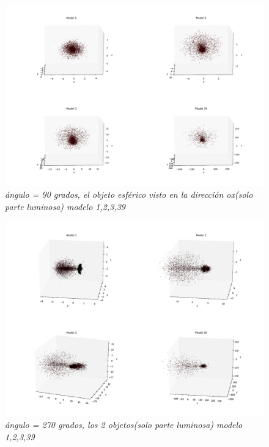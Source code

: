 \documentclass[12pt]{article} %
\renewcommand{\=}[1]{\stackrel{#1}{=}} %
\theoremstyle{definition}
\theoremstyle{remark}
\begin{document}
\begin{figure}[!ht]
 \centering
 \includegraphics[scale=0.2]{sep590deg-2ox.png}
 \caption{\emph{ ángulo = 90 grados, el objeto esférico visto en la dirección ox(solo parte luminosa) modelo 1,2,3,39 }}
\end{figure}

\begin{figure}[!ht]
 \centering
 \includegraphics[scale=0.2]{270deg_m_sep5.png}
 \caption{\emph{ ángulo = 270 grados, los 2 objetos(solo parte luminosa) modelo 1,2,3,39 }}
\end{figure}
\end{document}
